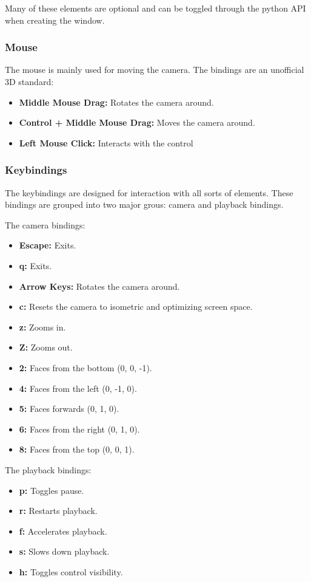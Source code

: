 \documentclass[a4paper,11pt]{article}
\begin{document}
Many of these elements are optional and can be toggled through the python API when creating the window.

\subsubsection{Mouse}

The mouse is mainly used for moving the camera. The bindings are an unofficial 3D standard:

\begin{itemize}
\item \textbf{Middle Mouse Drag:} Rotates the camera around.
\item \textbf{Control + Middle Mouse Drag:} Moves the camera around.
\item \textbf{Left Mouse Click:} Interacts with the control
\end{itemize}

\subsubsection{Keybindings}

The keybindings are designed for interaction with all sorts of elements. These bindings are grouped into two major grous: camera and playback bindings.

The camera bindings:

\begin{itemize}
\item \textbf{Escape:} Exits.
\item \textbf{q:} Exits.
\item \textbf{Arrow Keys:} Rotates the camera around.
\item \textbf{c:} Resets the camera to isometric and optimizing screen space.
\item \textbf{z:} Zooms in.
\item \textbf{Z:} Zooms out.
\item \textbf{2:} Faces from the bottom (0, 0, -1).
\item \textbf{4:} Faces from the left (0, -1, 0).
\item \textbf{5:} Faces forwards (0, 1, 0).
\item \textbf{6:} Faces from the right (0, 1, 0).
\item \textbf{8:} Faces from the top (0, 0, 1).
\end{itemize}

The playback bindings:

\begin{itemize}
\item \textbf{p:} Toggles pause.
\item \textbf{r:} Restarts playback.
\item \textbf{f:} Accelerates playback.
\item \textbf{s:} Slows down playback.
\item \textbf{h:} Toggles control visibility.
\end{itemize}
\end{document}
